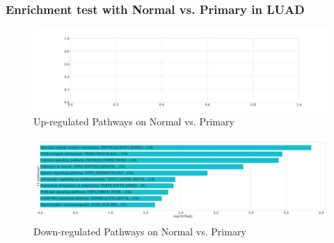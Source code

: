 \documentclass{beamer}
\begin{document}
    \begin{frame}
        \frametitle{Enrichment test with Normal vs. Primary in LUAD}

        \begin{figure}
            \includegraphics[width=0.8 \linewidth]{figures/DEG/Enrichment/STAR.ADC.Normal-Primary.Up.KEGG.pdf}
            \caption{Up-regulated Pathways on Normal vs. Primary}
        \end{figure}

        \begin{figure}
            \includegraphics[width=0.8 \linewidth]{figures/DEG/Enrichment/STAR.ADC.Normal-Primary.Down.KEGG.pdf}
            \caption{Down-regulated Pathways on Normal vs. Primary}
        \end{figure}
    \end{frame}
\end{document}
